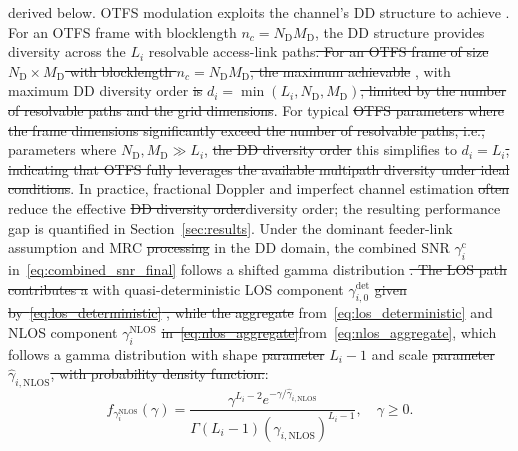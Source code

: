 \documentclass[lettersize,journal]{IEEEtran}
\providecommand{\DIFadd}[1]{{\protect\color{blue}#1}} %
\providecommand{\DIFdel}[1]{{\protect\color{red}\sout{#1}}}                      %
\providecommand{\DIFaddbegin}{} %
\providecommand{\DIFaddend}{} %
\providecommand{\DIFdelbegin}{} %
\providecommand{\DIFdelend}{} %
\newcommand{\DIFscaledelfig}{0.5}
\newlength{\DIFdelgraphicswidth} %
\newlength{\DIFdelgraphicsheight} %
\newcommand{\DIFaddincludegraphics}[2][]{{\color{blue}\fbox{\DIFOincludegraphics[#1]{#2}}}} %
\newcommand{\DIFdelincludegraphics}[2][]{%
\sbox{\DIFdelgraphicsbox}{\DIFOincludegraphics[#1]{#2}}%
\settoboxwidth{\DIFdelgraphicswidth}{\DIFdelgraphicsbox} %
\settoboxtotalheight{\DIFdelgraphicsheight}{\DIFdelgraphicsbox} %
\scalebox{\DIFscaledelfig}{%
\parbox[b]{\DIFdelgraphicswidth}{\usebox{\DIFdelgraphicsbox}\\[-\baselineskip] \rule{\DIFdelgraphicswidth}{0em}}\llap{\resizebox{\DIFdelgraphicswidth}{\DIFdelgraphicsheight}{%
\setlength{\unitlength}{\DIFdelgraphicswidth}%
\begin{picture}(1,1)%
\thicklines\linethickness{2pt} %
{\color[rgb]{1,0,0}\put(0,0){\framebox(1,1){}}}%
{\color[rgb]{1,0,0}\put(0,0){\line( 1,1){1}}}%
{\color[rgb]{1,0,0}\put(0,1){\line(1,-1){1}}}%
\end{picture}%
}\hspace*{3pt}}} %
} %
\DeclareRobustCommand{\DIFaddbegin}{\DIFOaddbegin \let\includegraphics\DIFaddincludegraphics} %
\DeclareRobustCommand{\DIFaddend}{\DIFOaddend \let\includegraphics\DIFOincludegraphics} %
\DeclareRobustCommand{\DIFdelbegin}{\DIFOdelbegin \let\includegraphics\DIFdelincludegraphics} %
\DeclareRobustCommand{\DIFdelend}{\DIFOaddend \let\includegraphics\DIFOincludegraphics} %
\begin{document}
{{derived below. OTFS modulation exploits the channel's DD structure to achieve }\DIFdelend \DIFaddbegin \DIFadd{. For an OTFS frame with blocklength $n_c = N_{\mathrm{D}} M_{\mathrm{D}}$, the DD structure provides }\DIFaddend diversity across the $L_i$ resolvable access-link paths\DIFdelbegin \DIFdel{. For an OTFS frame of size $N_{\mathrm{D}} \times M_{\mathrm{D}}$ with blocklength $n_c = N_{\mathrm{D}} M_{\mathrm{D}}$, the maximum achievable }\DIFdelend \DIFaddbegin \DIFadd{, with maximum }\DIFaddend DD diversity order \DIFdelbegin \DIFdel{is }\DIFdelend $d_i = \min(L_i, N_{\mathrm{D}}, M_{\mathrm{D}})$\DIFdelbegin \DIFdel{, limited by the number of resolvable paths and the grid dimensions}\DIFdelend . For typical \DIFdelbegin \DIFdel{OTFS parameters where the frame dimensions significantly exceed the number of resolvable paths, i.e., }\DIFdelend \DIFaddbegin \DIFadd{parameters where }\DIFaddend $N_{\mathrm{D}}, M_{\mathrm{D}} \gg L_i$, \DIFdelbegin \DIFdel{the DD diversity order }\DIFdelend \DIFaddbegin \DIFadd{this }\DIFaddend simplifies to $d_i = L_i$\DIFdelbegin \DIFdel{, indicating that OTFS fully leverages the available multipath diversity under ideal conditions}\DIFdelend . In practice, fractional Doppler and imperfect channel estimation \DIFdelbegin \DIFdel{often }\DIFdelend reduce the effective \DIFdelbegin \DIFdel{DD diversity order}\DIFdelend \DIFaddbegin \DIFadd{diversity order; the resulting performance gap is quantified in Section~\ref{sec:results}}\DIFaddend . Under the dominant feeder-link assumption and MRC \DIFdelbegin \DIFdel{processing }\DIFdelend in the DD domain, the combined SNR $\gamma_i^{\mathrm{c}}$ in~\eqref{eq:combined_snr_final} follows a shifted gamma distribution \DIFdelbegin \DIFdel{. The LOS path contributes a }\DIFdelend \DIFaddbegin \DIFadd{with }\DIFaddend quasi-deterministic \DIFaddbegin \DIFadd{LOS }\DIFaddend component $\gamma_{i,0}^{\mathrm{det}}$ \DIFdelbegin \DIFdel{given by~\eqref{eq:los_deterministic} , while the aggregate }\DIFdelend \DIFaddbegin \DIFadd{from~\eqref{eq:los_deterministic} and }\DIFaddend NLOS component $\gamma_i^{\mathrm{NLOS}}$ \DIFdelbegin \DIFdel{in~\eqref{eq:nlos_aggregate}}\DIFdelend \DIFaddbegin \DIFadd{from~\eqref{eq:nlos_aggregate}, which }\DIFaddend follows a gamma distribution with shape \DIFdelbegin \DIFdel{parameter }\DIFdelend $L_i - 1$ and scale \DIFdelbegin \DIFdel{parameter }\DIFdelend $\hat{\gamma}_{i,\mathrm{NLOS}}$\DIFdelbegin \DIFdel{, with probability density function:}\DIFdelend \DIFaddbegin \DIFadd{:}}
\DIFaddend \begin{equation}
f_{\gamma_{i}^{\mathrm{NLOS}}}(\gamma) = \frac{\gamma^{L_i-2} e^{-\gamma/\hat{\gamma}_{i,\mathrm{NLOS}}}}{\Gamma(L_i-1)(\hat{\gamma}_{i,\mathrm{NLOS}})^{L_i-1}}, \quad \gamma \geq 0.
\label{eq:nlos_pdf}
\end{equation}
\end{document}
